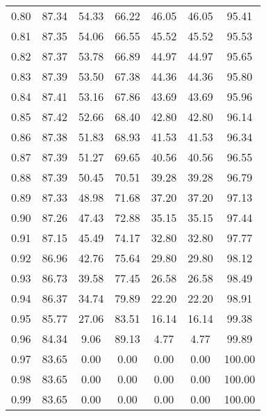 \begin{tabular}{|c|c|c|c|c|c|c|}
      0.80 &     87.34 &     54.33 &      66.22 &   46.05 &      46.05 &         95.41 \\
      0.81 &     87.35 &     54.06 &      66.55 &   45.52 &      45.52 &         95.53 \\
      0.82 &     87.37 &     53.78 &      66.89 &   44.97 &      44.97 &         95.65 \\
      0.83 &     87.39 &     53.50 &      67.38 &   44.36 &      44.36 &         95.80 \\
      0.84 &     87.41 &     53.16 &      67.86 &   43.69 &      43.69 &         95.96 \\
      0.85 &     87.42 &     52.66 &      68.40 &   42.80 &      42.80 &         96.14 \\
      0.86 &     87.38 &     51.83 &      68.93 &   41.53 &      41.53 &         96.34 \\
      0.87 &     87.39 &     51.27 &      69.65 &   40.56 &      40.56 &         96.55 \\
      0.88 &     87.39 &     50.45 &      70.51 &   39.28 &      39.28 &         96.79 \\
      0.89 &     87.33 &     48.98 &      71.68 &   37.20 &      37.20 &         97.13 \\
      0.90 &     87.26 &     47.43 &      72.88 &   35.15 &      35.15 &         97.44 \\
      0.91 &     87.15 &     45.49 &      74.17 &   32.80 &      32.80 &         97.77 \\
      0.92 &     86.96 &     42.76 &      75.64 &   29.80 &      29.80 &         98.12 \\
      0.93 &     86.73 &     39.58 &      77.45 &   26.58 &      26.58 &         98.49 \\
      0.94 &     86.37 &     34.74 &      79.89 &   22.20 &      22.20 &         98.91 \\
      0.95 &     85.77 &     27.06 &      83.51 &   16.14 &      16.14 &         99.38 \\
      0.96 &     84.34 &      9.06 &      89.13 &    4.77 &       4.77 &         99.89 \\
      0.97 &     83.65 &      0.00 &       0.00 &    0.00 &       0.00 &        100.00 \\
      0.98 &     83.65 &      0.00 &       0.00 &    0.00 &       0.00 &        100.00 \\
      0.99 &     83.65 &      0.00 &       0.00 &    0.00 &       0.00 &        100.00 \\
\bottomrule
\end{tabular}
